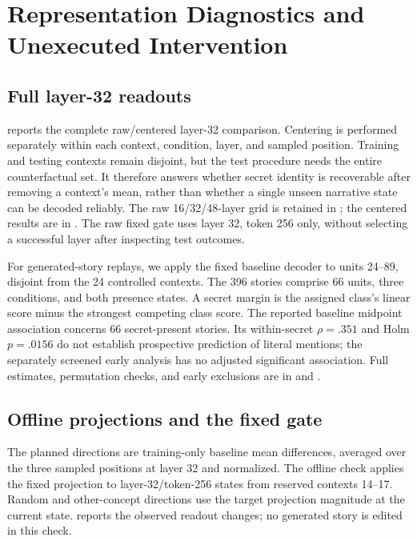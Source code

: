 \clearpage
\section{Representation Diagnostics and Unexecuted Intervention}
\label{sec:representations}
\subsection{Full layer-32 readouts}
 reports the complete raw/centered layer-32 comparison. Centering is performed separately within each context, condition, layer, and sampled position. Training and testing contexts remain disjoint, but the test procedure needs the entire counterfactual set. It therefore answers whether secret identity is recoverable after removing a context's mean, rather than whether a single unseen narrative state can be decoded reliably. The raw 16/32/48-layer grid is retained in ; the centered results are in . The raw fixed gate uses layer 32, token 256 only, without selecting a successful layer after inspecting test outcomes.


For generated-story replays, we apply the fixed baseline decoder to units 24--89, disjoint from the 24 controlled contexts. The 396 stories comprise 66 units, three conditions, and both presence states. A secret margin is the assigned class's linear score minus the strongest competing class score. The reported baseline midpoint association concerns 66 secret-present stories. Its within-secret $\rho=.351$ and Holm $p=.0156$ do not establish prospective prediction of literal mentions; the separately screened early analysis has no adjusted significant association. Full estimates, permutation checks, and early exclusions are in  and .

\subsection{Offline projections and the fixed gate}
The planned directions are training-only baseline mean differences, averaged over the three sampled positions at layer 32 and normalized. The offline check applies the fixed projection to layer-32/token-256 states from reserved contexts 14--17. Random and other-concept directions use the target projection magnitude at the current state.  reports the observed readout changes; no generated story is edited in this check.


